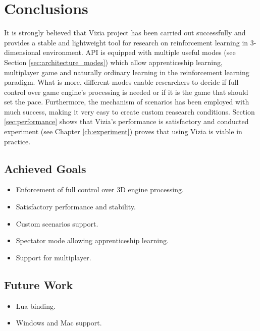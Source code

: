 \chapter{Conclusions}\label{ch:conclusions}
	It is strongly believed that Vizia project has been carried out successfully and provides a stable and lightweight tool for research on reinforcement learning in 3-dimensional environment. API is equipped with multiple useful modes (see Section \ref{sec:architecture_modes}) which allow apprenticeship learning, multiplayer game and naturally ordinary learning in the reinforcement learning paradigm. What is more, different modes enable researchers to decide if full control over game engine's processing is needed or if it is the game that should set the pace. Furthermore, the mechanism of scenarios has been employed with much success, making it very easy to create custom reasearch conditions. Section \ref{sec:performance} shows that Vizia's performance is satisfactory and conducted experiment (see Chapter \ref{ch:experiment}) proves that using Vizia is viable in practice. 

\section{Achieved Goals}
	\begin{itemize}
		\item Enforcement of full control over 3D engine processing.
		\item Satisfactory performance and stability.
		\item Custom scenarios support.
		\item Spectator mode allowing apprenticeship learning.
		\item Support for multiplayer.
	\end{itemize}

\section{Future Work}
	\begin{itemize}
		\item Lua binding.
		\item Windows and Mac support.
	\end{itemize}
